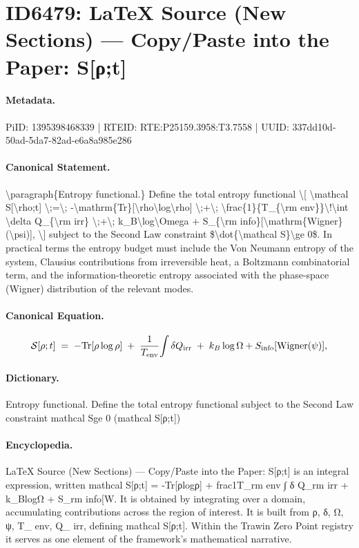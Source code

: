 \section*{ID6479: LaTeX Source (New Sections) — Copy/Paste into the Paper: S[ρ;t]}
\paragraph{Metadata.}
PiID: 1395398468339 | RTEID: RTE:P25159.3958:T3.7558 | UUID: 337dd10d-50ad-5da7-82ad-e6a8a985e286

\paragraph{Canonical Statement.}
\textbackslash{}paragraph\{Entropy functional.\} Define the total entropy functional \textbackslash{}[ \textbackslash{}mathcal S[\textbackslash{}rho;t] \textbackslash{};=\textbackslash{}; -\textbackslash{}mathrm\{Tr\}[\textbackslash{}rho\textbackslash{}log\textbackslash{}rho] \textbackslash{};+\textbackslash{}; \textbackslash{}frac\{1\}\{T\_\{\textbackslash{}rm env\}\}\textbackslash{}!\textbackslash{}int \textbackslash{}delta Q\_\{\textbackslash{}rm irr\} \textbackslash{};+\textbackslash{}; k\_B\textbackslash{}log\textbackslash{}Omega + S\_\{\textbackslash{}rm info\}[\textbackslash{}mathrm\{Wigner\}(\textbackslash{}psi)], \textbackslash{}] subject to the Second Law constraint \$\textbackslash{}dot\{\textbackslash{}mathcal S\}\textbackslash{}ge 0\$. In practical terms the entropy budget must include the Von Neumann entropy of the system, Clausius contributions from irreversible heat, a Boltzmann combinatorial term, and the information-theoretic entropy associated with the phase-space (Wigner) distribution of the relevant modes.

\paragraph{Canonical Equation.}
\[
\mathcal S[\rho;t] \;=\; -\mathrm{Tr}[\rho\log\rho] \;+\; \frac{1}{T_{\rm env}}\!\int \delta Q_{\rm irr} \;+\; k_B\log\Omega + S_{\rm info}[\mathrm{Wigner}(\psi)],
\]

\paragraph{Dictionary.}
Entropy functional. Define the total entropy functional subject to the Second Law constraint mathcal Sge 0 (mathcal S[ρ;t])

\paragraph{Encyclopedia.}
LaTeX Source (New Sections) — Copy/Paste into the Paper: S[ρ;t] is an integral expression, written mathcal S[ρ;t] = -Tr[ρlogρ] + frac1T\_rm env ∫ δ Q\_rm irr + k\_BlogΩ + S\_rm info[W. It is obtained by integrating over a domain, accumulating contributions across the region of interest. It is built from ρ, δ, Ω, ψ, T\_ env, Q\_ irr, defining mathcal S[ρ;t]. Within the Trawin Zero Point registry it serves as one element of the framework's mathematical narrative.
